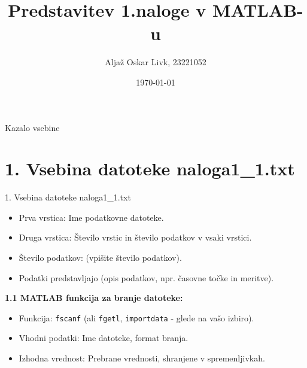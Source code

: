 \documentclass{beamer}
\title{Predstavitev 1.naloge v MATLAB-u}
\author{Aljaž Oskar Livk, 23221052}
\date{\today}
\begin{document}
\begin{frame}
    \titlepage %
\end{frame}

\begin{frame}{Kazalo vsebine}
    \tableofcontents
\end{frame}

\section{1. Vsebina datoteke naloga1\_1.txt }
\begin{frame}{1. Vsebina datoteke naloga1\_1.txt}
    \begin{itemize}
        \item Prva vrstica: Ime podatkovne datoteke.
        \item Druga vrstica: Število vrstic in število podatkov v vsaki vrstici.
        \item Število podatkov: (vpišite število podatkov).
        \item Podatki predstavljajo (opis podatkov, npr. časovne točke in meritve).
    \end{itemize}
    
    \vspace{1em} %
    
    \textbf{1.1 MATLAB funkcija za branje datoteke:}
    \begin{itemize}
        \item Funkcija: \texttt{fscanf} (ali \texttt{fgetl}, \texttt{importdata} - glede na vašo izbiro).
        \item Vhodni podatki: Ime datoteke, format branja.
        \item Izhodna vrednost: Prebrane vrednosti, shranjene v spremenljivkah.
    \end{itemize}
\end{frame}

\end{document}
